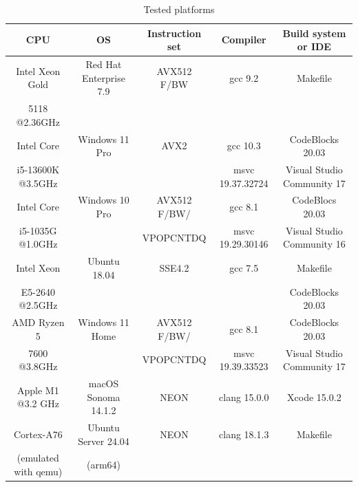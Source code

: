 	\begin{table}[h]
		\caption{Tested platforms}
		\label{Platforms}
		\begin{center}
			\begin{tabular}{|c|c|c|c|c|}
				\hline
				CPU & OS & Instruction set & Compiler  &  Build system or IDE\\
				\hline
				\hline
				Intel Xeon Gold & Red Hat Enterprise 7.9 & AVX512 F/BW & gcc 9.2 & Makefile\\
				 5118 @2.36GHz & & & & \\
				\hline 
				Intel Core  & Windows 11 Pro & AVX2 & gcc 10.3 & CodeBlocks 20.03\\
				i5-13600K @3.5GHz &  &  & msvc 19.37.32724 &  Visual Studio Community 17\\
				\hline
				Intel Core  & Windows 10 Pro &  AVX512 F/BW/ & gcc 8.1 & CodeBlocs 20.03\\
				i5-1035G @1.0GHz &  & VPOPCNTDQ &  msvc 19.29.30146 & Visual Studio Community 16\\
				\hline
				Intel Xeon &  Ubuntu 18.04 & SSE4.2 & gcc 7.5 & Makefile\\
				E5-2640 @2.5GHz & & & & CodeBlocks 20.03 \\
				\hline
				AMD Ryzen 5 &  Windows 11 Home & AVX512 F/BW/ & gcc 8.1 & CodeBlocks 20.03\\
				7600 @3.8GHz &	&  VPOPCNTDQ& msvc 19.39.33523 &  Visual Studio Community 17\\
				\hline
				Apple M1 @3.2 GHz & macOS Sonoma 14.1.2 & NEON & clang 15.0.0 & Xcode 15.0.2\\
				\hline
				Cortex-A76  & Ubuntu Server 24.04 & NEON & clang 18.1.3 &  Makefile\\
				(emulated with qemu) & (arm64)& & & \\
				\hline
			
			\end{tabular}
		\end{center}
	\end{table}
